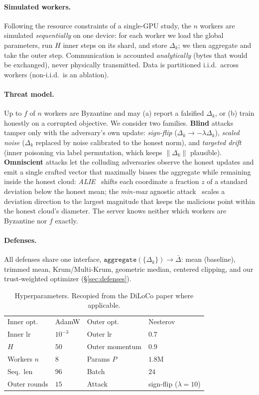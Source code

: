 \documentclass[11pt]{article}
\newcommand{\dg}{\Delta}          %
\newcommand{\agg}{\bar{\Delta}}   %
\begin{document}
\paragraph{Simulated workers.}
Following the resource constraints of a single-GPU study, the $n$ workers are simulated
\emph{sequentially} on one device: for each worker we load the global parameters, run $H$
inner steps on its shard, and store $\dg_k$; we then aggregate and take the outer step.
Communication is accounted \emph{analytically} (bytes that would be exchanged), never
physically transmitted. Data is partitioned i.i.d.\ across workers (non-i.i.d.\ is an
ablation).

\paragraph{Threat model.}
Up to $f$ of $n$ workers are Byzantine and may (a) report a falsified $\dg_k$, or (b) train
honestly on a corrupted objective. We consider two families. \textbf{Blind} attacks tamper
only with the adversary's own update: \emph{sign-flip} ($\dg_k \to -\lambda\dg_k$),
\emph{scaled noise} ($\dg_k$ replaced by noise calibrated to the honest norm), and
\emph{targeted drift} (inner poisoning via label permutation, which keeps $\|\dg_k\|$
plausible). \textbf{Omniscient} attacks let the colluding adversaries observe the honest
updates and emit a single crafted vector that maximally biases the aggregate while remaining
inside the honest cloud: \emph{ALIE}~\citep{alie2019} shifts each coordinate a fraction $z$
of a standard deviation below the honest mean; the \emph{min-max} agnostic
attack~\citep{minmax2021} scales a deviation direction to the largest magnitude that keeps the
malicious point within the honest cloud's diameter. The server knows neither which workers are
Byzantine nor $f$ exactly.

\paragraph{Defenses.}
All defenses share one interface, $\texttt{aggregate}(\{\dg_k\}) \to \agg$: mean (baseline),
trimmed mean, Krum/Multi-Krum, geometric median, centered clipping, and our trust-weighted
optimizer (\S\ref{sec:defenses}).

\begin{table}[t]
  \centering
  \caption{Hyperparameters. Recopied from the DiLoCo paper where applicable.}
  \label{tab:hp}
  \begin{tabular}{llll}
    \toprule
    Inner opt.\ & AdamW & Outer opt.\ & Nesterov \\
    Inner lr & $10^{-3}$ & Outer lr & $0.7$ \\
    $H$ & $50$ & Outer momentum & $0.9$ \\
    Workers $n$ & $8$ & Params $P$ & $1.8$M \\
    Seq.\ len & $96$ & Batch & $24$ \\
    Outer rounds & $15$ & Attack & sign-flip ($\lambda{=}10$) \\
    \bottomrule
  \end{tabular}
\end{table}
\end{document}
